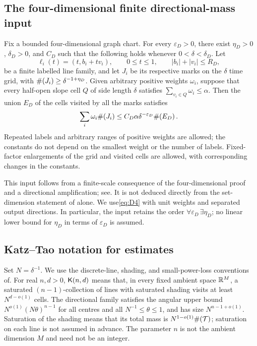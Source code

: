 \subsection{The four-dimensional finite directional-mass input}

\begin{inputthm}\label{input:D4}
Fix a bounded four-dimensional graph chart. For every $\varepsilon_D>0$, there exist
$\eta_D>0$, $\delta_D>0$, and $C_D$ such that the following holds whenever $0<\delta<\delta_D$.
Let
\[
 \ell_i(t)=(t,b_i+t v_i),\qquad 0\le t\le1,\qquad
 |b_i|+|v_i|\le R_D,
\]
be a finite labelled line family, and let $J_i$ be its respective marks on the $\delta$ time grid, with
$\#\!\left(J_i\right)\ge\delta^{-1+\eta_D}$.
Given arbitrary positive weights $\omega_i$, suppose that every half-open slope cell $Q$ of side length $\delta$
satisfies $\sum_{v_i\in Q}\omega_i\le\alpha$.
Then the union $E_D$ of the cells visited by all the marks satisfies
\begin{equation}\label{eq:D4}
 \sum_i\omega_i\#\!\left(J_i\right)
 \le C_D\alpha\delta^{-\varepsilon_D}\#\!\left(E_D\right).
\end{equation}
Repeated labels and arbitrary ranges of positive weights are allowed; the constants do not depend on the smallest weight or the number of labels.
Fixed-factor enlargements of the grid and visited cells are allowed, with corresponding changes in the constants.
\end{inputthm}

This input follows from a finite-scale consequence of the four-dimensional proof and a directional amplification;
see\cite{ArchiveSource,ArchiveDIR}.
It is not deduced directly from the set-dimension statement of\cite[Theorem 1.1]{OAI4} alone.
We use\eqref{eq:D4} with unit weights and separated output directions.
In particular, the input retains the order $\forall\varepsilon_D\,\exists\eta_D$;
no linear lower bound for $\eta_D$ in terms of $\varepsilon_D$ is assumed.

\subsection{Katz--Tao notation for estimates}

Set $N=\delta^{-1}$. We use the discrete-line, shading, and small-power-loss conventions of\cite[Definitions 5.1, 5.2, 6.1]{KT}.
For real $n,d>0$, $\mathsf K(n,d)$ means that, in every fixed ambient space $\mathbb R^M$,
a saturated $(n-1)$-collection of lines with saturated shading visits at least $N^{d-o(1)}$ cells.
The directional family satisfies the angular upper bound $N^{o(1)}(N\theta)^{n-1}$
for all centres and all $N^{-1}\le\theta\le1$, and has size $N^{n-1+o(1)}$.
Saturation of the shading means that its total mass is $N^{1-o(1)}\#\!\left(\mathcal T\right)$; saturation on each line is not assumed in advance.
The parameter $n$ is not the ambient dimension $M$ and need not be an integer.

